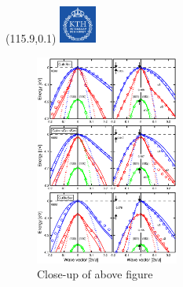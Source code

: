 \documentclass[]{beamer}
\newcommand{\MyLogo}{%
\begin{textblock}{14}(115.9,0.1)
  \includegraphics[width=1.22cm]{kth_rgb}
 \end{textblock}
}
\begin{document}
\begin{frame}
\MyLogo
\begin{figure}[H]
\centering
\includegraphics[width=0.42\textwidth,clip]{seminar/bandstructure_closeup} 
\caption{Close-up of above figure}
\label{closeup}
\end{figure}
\end{frame}
\end{document}

